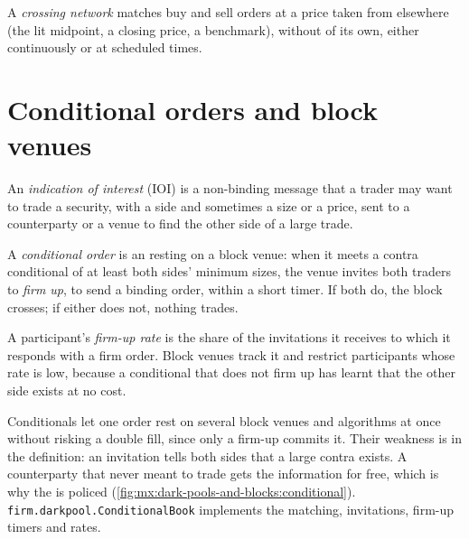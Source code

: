 \begin{definition}\label{def:mx:dark-pools-and-blocks:crossing}
A \emph{crossing network} matches buy and sell orders at a price taken from elsewhere (the lit midpoint, a closing price, a
benchmark), without  of its own, either continuously or at scheduled times.
\end{definition}

\section{Conditional orders and block venues}

\begin{definition}\label{def:mx:dark-pools-and-blocks:ioi}
An \emph{indication of interest} (IOI) is a non-binding message that a trader may want to trade a security, with a side
and sometimes a size or a price, sent to a counterparty or a venue to find the other side of a large trade.
\end{definition}

\begin{definition}\label{def:mx:dark-pools-and-blocks:conditional}
A \emph{conditional order} is an  resting on a block venue: when it meets a contra conditional of at
least both sides' minimum sizes, the venue invites both traders to \emph{firm up}, to send a binding order, within a short timer. If both do, the block
crosses; if either does not, nothing trades.
\end{definition}

\begin{definition}\label{def:mx:dark-pools-and-blocks:firmup}
A participant's \emph{firm-up rate} is the share of the invitations it receives to which it responds with a firm order. Block
venues track it and restrict participants whose rate is low, because a conditional that does not firm up has learnt that the other side exists at no cost.
\end{definition}

Conditionals let one order rest on several block venues and algorithms at once without risking a double fill, since only a firm-up commits it. Their
weakness is in the definition: an invitation tells both sides that a large contra exists. A counterparty that never meant to trade gets the information
for free, which is why the  is policed (\cref{fig:mx:dark-pools-and-blocks:conditional}). \texttt{firm.darkpool.ConditionalBook} implements
the matching, invitations, firm-up timers and rates.

